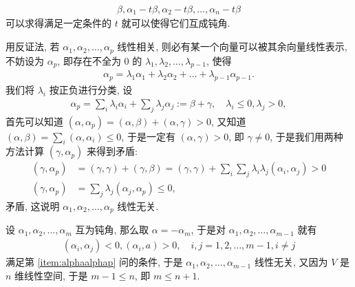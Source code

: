 \begin{exercise}[series=exer]
\begin{hint}
\begin{hintsheet}
          \begin{align*}
              \beta, \alpha_{1} - t\beta, \alpha_{2} - t\beta, \dots, \alpha_{n} - t\beta
          \end{align*}
          可以求得满足一定条件的 $ t $ 就可以使得它们互成钝角.
      \end{hintsheet}
  \end{hint}
  \begin{answer}
      \begin{answersheet}
          \item 用反证法, 若 $ \alpha_{1}, \alpha_{2}, \dots, \alpha_{p} $ 线性相关, 则必有某一个向量可以被其余向量线性表示, 不妨设为 $ \alpha_{p} $, 即存在不全为 $ 0 $ 的 $ \lambda_{1}, \lambda_{2}, \dots, \lambda_{p - 1} $, 使得
          \begin{align*}
              \alpha_{p} = \lambda_{1}\alpha_{1} + \lambda_{2}\alpha_{2} + \dots + \lambda_{p - 1}\alpha_{p - 1}.
          \end{align*}
          我们将 $ \lambda_{i} $ 按正负进行分类, 设
          \begin{align*}
              \alpha_{p} = \sum_{i}\lambda_{i}\alpha_{i} + \sum_{j}\lambda_{j}\alpha_{j} := \beta + \gamma,\quad \lambda_{i} \le 0, \lambda_{j} > 0,
          \end{align*}
          首先可以知道 $ (\alpha, \alpha_{p}) = (\alpha, \beta) + (\alpha, \gamma) > 0 $, 又知道 $ (\alpha, \beta) = \sum_{i}(\alpha, \alpha_{i}) \le 0 $, 于是一定有 $ (\alpha, \gamma) > 0 $, 即 $ \gamma \ne 0 $, 于是我们用两种方法计算 $ (\gamma, \alpha_{p}) $ 来得到矛盾:
          \begin{align*}
              (\gamma, \alpha_{p}) & = (\gamma, \gamma) + (\gamma, \beta) = (\gamma, \gamma) + \sum_{i}\sum_{j}\lambda_{i}\lambda_{j}(\alpha_{i}, \alpha_{j}) > 0 \\
              (\gamma, \alpha_{p}) & = \sum_{j}\lambda_{j}(\alpha_{j}, \alpha_{p}) \le 0,
          \end{align*}
          矛盾, 这说明 $ \alpha_{1}, \alpha_{2}, \dots, \alpha_{p} $ 线性无关.
          \item 设 $ \alpha_{1}, \alpha_{2}, \dots, \alpha_{m} $ 互为钝角, 那么取 $ \alpha = -\alpha_{m} $, 于是对 $ \alpha_{1}, \alpha_{2}, \dots, \alpha_{m - 1} $ 就有
          \begin{align*}
              (\alpha_{i}, \alpha_{j}) < 0, (\alpha_{i}, a) > 0, \quad i, j = 1, 2, \dots, m - 1, i \ne j
          \end{align*}
          满足第 \ref{item:alphaalphap} 问的条件, 于是 $ \alpha_{1}, \alpha_{2}, \dots, \alpha_{m - 1} $ 线性无关, 又因为 $ V $ 是 $ n $ 维线性空间, 于是 $ m - 1 \le n $, 即 $ m \le n + 1 $.

\end{answersheet}
\end{answer}
\end{exercise}
